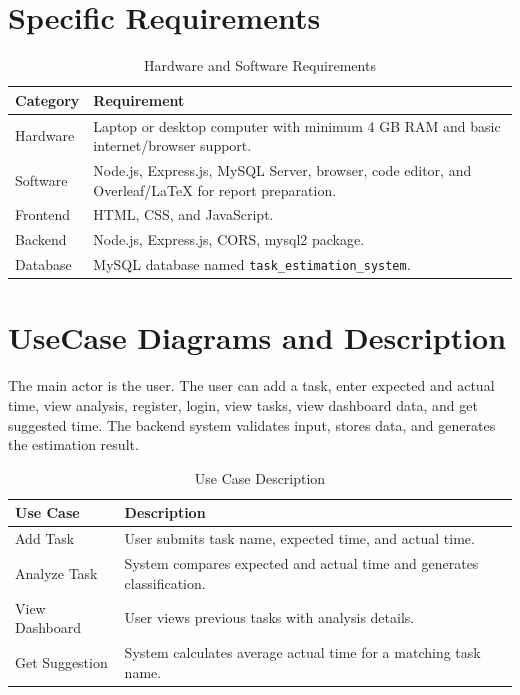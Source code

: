 \section{Specific Requirements}
\begin{table}[H]
\centering
\begin{tabular}{|M|L|}
\hline
\textbf{Category} & \textbf{Requirement} \\
\hline
Hardware & Laptop or desktop computer with minimum 4 GB RAM and basic internet/browser support. \\
\hline
Software & Node.js, Express.js, MySQL Server, browser, code editor, and Overleaf/LaTeX for report preparation. \\
\hline
Frontend & HTML, CSS, and JavaScript. \\
\hline
Backend & Node.js, Express.js, CORS, mysql2 package. \\
\hline
Database & MySQL database named \texttt{task\_estimation\_system}. \\
\hline
\end{tabular}
\caption{Hardware and Software Requirements}
\end{table}

\section{UseCase Diagrams and Description}
\begin{justify}
The main actor is the user. The user can add a task, enter expected and actual time, view analysis, register, login, view tasks, view dashboard data, and get suggested time. The backend system validates input, stores data, and generates the estimation result.
\end{justify}

\begin{table}[H]
\centering
\begin{tabular}{|M|L|}
\hline
\textbf{Use Case} & \textbf{Description} \\
\hline
Add Task & User submits task name, expected time, and actual time. \\
\hline
Analyze Task & System compares expected and actual time and generates classification. \\
\hline
View Dashboard & User views previous tasks with analysis details. \\
\hline
Get Suggestion & System calculates average actual time for a matching task name. \\
\hline
\end{tabular}
\caption{Use Case Description}
\end{table}
